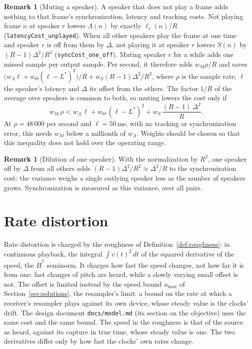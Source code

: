 \documentclass[11pt,a4paper]{article}
\newcommand{\lean}[1]{\texttt{#1}}
\theoremstyle{definition}
\newtheorem{remark}[definition]{Remark}
\begin{document}
\begin{remark}[Muting a speaker]
A speaker that does not play a frame adds nothing to that frame's
synchronization, latency and tracking costs. Not playing frame $n$ at
speaker $r$ lowers $\Lambda(n)$ by exactly $\ell_r(n)/R$
(\lean{latencyCost\_unplayed}). When all other speakers play the frame at
one time and speaker $r$ is off from them by $\Delta$, not playing it at
speaker $r$ lowers $S(n)$ by $(R-1)\Delta^2/R^2$
(\lean{syncCost\_one\_off}). Muting speaker $r$ for a while adds one missed
sample per output sample. Per second, it therefore adds $w_M\rho/R$ and
saves $\bigl(w_\Lambda \ell + w_\Theta(\ell - L^*)^2\bigr)/R +
w_S(R-1)\Delta^2/R^2$, where $\rho$ is the sample rate, $\ell$ the
speaker's latency and $\Delta$ its offset from the others. The factor $1/R$
of the average over speakers is common to both, so muting lowers the cost
only if
\[
  w_M\,\rho < w_\Lambda\,\ell + w_\Theta\,(\ell - L^*)^2 + w_S\,\frac{(R-1)\,\Delta^2}{R}.
\]
At $\rho = 48\,000$ per second and $\ell = 50$\,ms, with no tracking or
synchronization error, this needs $w_M$ below a millionth of $w_\Lambda$.
Weights should be chosen so that this inequality does not hold over the
operating range.
\end{remark}

\begin{remark}[Dilution of one speaker]
With the normalization by $R^2$, one speaker off by $\Delta$ from all
others adds $(R-1)\Delta^2/R^2 \approx \Delta^2/R$ to the synchronization
cost: the variance weighs a single outlying speaker less as the number of
speakers grows. Synchronization is measured as this variance, over all
pairs.
\end{remark}

\section{Rate distortion}

Rate distortion is charged by the roughness of
Definition~\ref{def:roughness}: in continuous playback, the integral
$\int \dot v(t)^2\,dt$ of the squared derivative of the speed, the
$\dot H^1$ seminorm. It charges how fast the speed changes, not how far it
is from one: fast changes of pitch are heard, while a slowly varying small
offset is not. The offset is limited instead by the speed bound $u_{\max}$
of Section~\ref{sec:solutions}, the resampler's limit: a bound on the rate
at which a receiver's resampler plays against its own device, whose steady
value is the clocks' drift. The design document \lean{docs/model.md} (its
section on the objective) uses the same cost and the same bound. The speed
in the roughness is that of the source as heard, against its capture in
true time, whose steady value is one. The two derivatives differ only by
how fast the clocks' own rates change.
\end{document}
